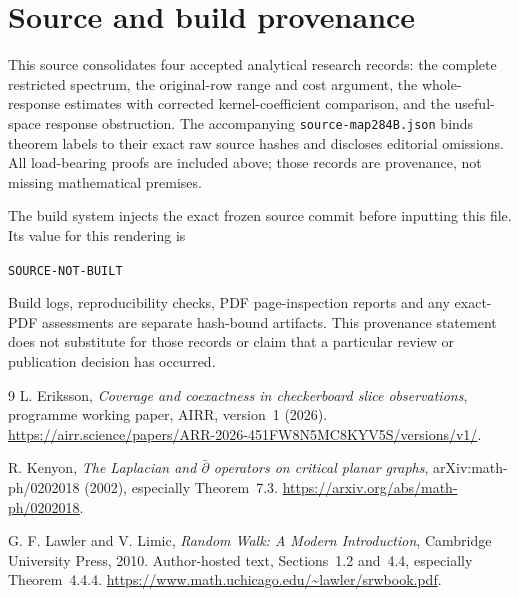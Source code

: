 \documentclass[11pt]{article}
\providecommand{\SourceCommit}{SOURCE-NOT-BUILT}
\theoremstyle{definition}
\theoremstyle{remark}
\begin{document}
\appendix
\section{Source and build provenance}\label{app:provenance}
This source consolidates four accepted analytical research records: the
complete restricted spectrum, the original-row range and cost argument,
the whole-response estimates with corrected kernel-coefficient comparison,
and the useful-space response obstruction. The accompanying
\texttt{source-map284B.json} binds theorem labels to their exact raw source
hashes and discloses editorial omissions. All load-bearing proofs are
included above; those records are provenance, not missing mathematical
premises.

The build system injects the exact frozen source commit before inputting
this file. Its value for this rendering is
\begin{center}\texttt{\SourceCommit}\end{center}
Build logs, reproducibility checks, PDF page-inspection reports and any
exact-PDF assessments are separate hash-bound artifacts. This provenance
statement does not substitute for those records or claim that a particular
review or publication decision has occurred.

\begin{thebibliography}{9}
L. Eriksson, \emph{Coverage and coexactness in checkerboard slice observations},
programme working paper, AIRR, version~1 (2026).
\url{https://airr.science/papers/ARR-2026-451FW8N5MC8KYV5S/versions/v1/}.

R. Kenyon, \emph{The Laplacian and $\bar\partial$ operators on critical planar
graphs}, arXiv:math-ph/0202018 (2002), especially Theorem~7.3.
\url{https://arxiv.org/abs/math-ph/0202018}.

G. F. Lawler and V. Limic, \emph{Random Walk: A Modern Introduction},
Cambridge University Press, 2010. Author-hosted text, Sections~1.2 and~4.4,
especially Theorem~4.4.4.
\url{https://www.math.uchicago.edu/~lawler/srwbook.pdf}.
\end{thebibliography}
\end{document}

